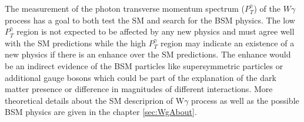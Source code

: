 The measurement of the photon transverse momentum spectrum ($P_T^{\gamma}$) of the $W\gamma$ process has a goal to both test the SM and search for the BSM physics. The low $P_T^{\gamma}$ region is not expected to be affected by any new physics and must agree well with the SM predictions while the high $P_T^{\gamma}$ region may indicate an existence of a new physics if there is an enhance over the SM predictions. The enhance would be an indirect evidence of the BSM particles like supersymmetric particles or additional gauge bosons which could be part of the explanation of the dark matter presence or difference in magnitudes of different interactions. More theoretical details about the SM descriprion of W$\gamma$ process as well as the possible BSM physics are given in the chapter \ref{sec:WgAbout}. \\   


